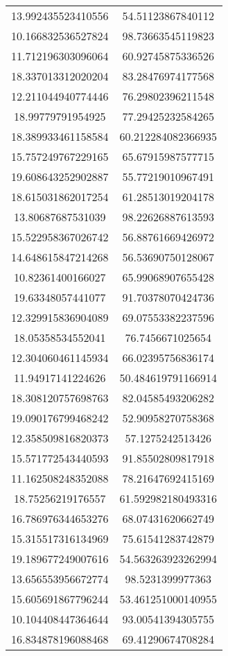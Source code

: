 \begin{table}
\begin{tabular}{cc}
13.992435523410556 & 54.51123867840112 \\
10.166832536527824 & 98.73663545119823 \\
11.712196303096064 & 60.92745875336526 \\
18.337013312020204 & 83.28476974177568 \\
12.211044940774446 & 76.29802396211548 \\
18.99779791954925 & 77.29425232584265 \\
18.389933461158584 & 60.212284082366935 \\
15.757249767229165 & 65.67915987577715 \\
19.608643252902887 & 55.77219010967491 \\
18.615031862017254 & 61.28513019204178 \\
13.80687687531039 & 98.22626887613593 \\
15.522958367026742 & 56.88761669426972 \\
14.648615847214268 & 56.53690750128067 \\
10.82361400166027 & 65.99068907655428 \\
19.63348057441077 & 91.70378070424736 \\
12.329915836904089 & 69.07553382237596 \\
18.05358534552041 & 76.7456671025654 \\
12.304060461145934 & 66.02395756836174 \\
11.94917141224626 & 50.484619791166914 \\
18.308120757698763 & 82.04585493206282 \\
19.090176799468242 & 52.90958270758368 \\
12.358509816820373 & 57.1275242513426 \\
15.571772543440593 & 91.85502809817918 \\
11.162508248352088 & 78.21647692415169 \\
18.75256219176557 & 61.592982180493316 \\
16.786976344653276 & 68.07431620662749 \\
15.315517316134969 & 75.61541283742879 \\
19.189677249007616 & 54.563263923262994 \\
13.656553956672774 & 98.5231399977363 \\
15.605691867796244 & 53.461251000140955 \\
10.104408447364644 & 93.00541394305755 \\
16.834878196088468 & 69.41290674708284 \\

\end{tabular}
\end{table}
